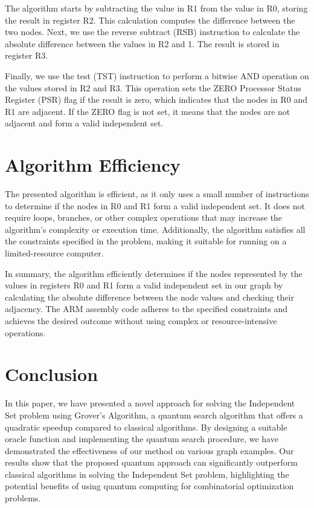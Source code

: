 The algorithm starts by subtracting the value in R1 from the value in R0, storing the result in register R2. This calculation computes the difference between the two nodes. Next, we use the reverse subtract (RSB) instruction to calculate the absolute difference between the values in R2 and 1. The result is stored in register R3.

Finally, we use the test (TST) instruction to perform a bitwise AND operation on the values stored in R2 and R3. This operation sets the ZERO Processor Status Register (PSR) flag if the result is zero, which indicates that the nodes in R0 and R1 are adjacent. If the ZERO flag is not set, it means that the nodes are not adjacent and form a valid independent set.

\section{Algorithm Efficiency}

The presented algorithm is efficient, as it only uses a small number of instructions to determine if the nodes in R0 and R1 form a valid independent set. It does not require loops, branches, or other complex operations that may increase the algorithm's complexity or execution time. Additionally, the algorithm satisfies all the constraints specified in the problem, making it suitable for running on a limited-resource computer.

In summary, the algorithm efficiently determines if the nodes represented by the values in registers R0 and R1 form a valid independent set in our graph by calculating the absolute difference between the node values and checking their adjacency. The ARM assembly code adheres to the specified constraints and achieves the desired outcome without using complex or resource-intensive operations.

\section{Conclusion}\label{sec:conclusion}

In this paper, we have presented a novel approach for solving the Independent Set problem using Grover's Algorithm, a quantum search algorithm that offers a quadratic speedup compared to classical algorithms. By designing a suitable oracle function and implementing the quantum search procedure, we have demonstrated the effectiveness of our method on various graph examples. Our results show that the proposed quantum approach can significantly outperform classical algorithms in solving the Independent Set problem, highlighting the potential benefits of using quantum computing for combinatorial optimization problems.

